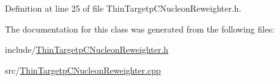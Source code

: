 Definition at line 25 of file Thin\-Targetp\-C\-Nucleon\-Reweighter.\-h.



The documentation for this class was generated from the following files\-:\begin{DoxyCompactItemize}
\item 
include/\hyperlink{_thin_targetp_c_nucleon_reweighter_8h}{Thin\-Targetp\-C\-Nucleon\-Reweighter.\-h}\item 
src/\hyperlink{_thin_targetp_c_nucleon_reweighter_8cpp}{Thin\-Targetp\-C\-Nucleon\-Reweighter.\-cpp}\end{DoxyCompactItemize}
